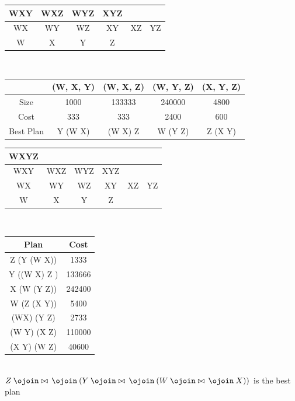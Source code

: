 \documentclass[12pt, letterpaper, fleqn]{article}
\def\fullouterjoin{\mathbin{\ojoin\mkern0mu\bowtie\mkern3mu\ojoin}}
\begin{document}
  \begin{center}
  \begin{tabular} {| c | c | c | c | c | c |}
  \hline
  WXY & WXZ & WYZ & XYZ & &\\
  \hline
  WX & WY & WZ & XY & XZ & YZ \\
  \hline
  W & X & Y & Z & & \\
  \hline
  \end{tabular}\\
  \begin{tabular} { c | c | c | c | c }
  & (W, X, Y) & (W, X, Z) & (W, Y, Z) & (X, Y, Z)  \\
  \hline
  Size & 1000 & 133333 & 240000 & 4800 \\
  Cost & 333  & 333 & 2400 & 600  \\
  Best Plan & Y \fullouterjoin (W \fullouterjoin X)  & (W \fullouterjoin X)
  \fullouterjoin Z & W \fullouterjoin (Y \fullouterjoin Z) & Z \fullouterjoin (X \fullouterjoin Y)
  \\
  \end{tabular}
  \end{center}

  \begin{center}
  \begin{tabular} {| c | c | c | c | c | c |}
  \hline
  WXYZ & & & & & \\
  \hline
  WXY & WXZ & WYZ & XYZ  & &  \\
  \hline
  WX & WY & WZ & XY & XZ & YZ \\
  \hline
  W & X & Y & Z & & \\
  \hline
  \end{tabular}\\
  \begin{tabular} { c | c  }
  Plan & Cost \\ 
  \hline
  Z \fullouterjoin (Y \fullouterjoin (W \fullouterjoin X)) &  1333 \\
  Y \fullouterjoin ((W \fullouterjoin X) \fullouterjoin Z )&  133666\\
  X \fullouterjoin (W \fullouterjoin (Y \fullouterjoin Z)) & 242400 \\
  W \fullouterjoin (Z \fullouterjoin (X \fullouterjoin Y)) &  5400 \\
  (W\fullouterjoin X) \fullouterjoin (Y \fullouterjoin Z)  & 2733 \\
  (W \fullouterjoin Y) \fullouterjoin (X \fullouterjoin Z) & 110000 \\
  (X \fullouterjoin Y) \fullouterjoin (W \fullouterjoin Z) & 40600 \\


  \end{tabular}
  \end{center}\\
  $Z \fullouterjoin (Y \fullouterjoin (W \fullouterjoin X))$ is the best plan
  \\\\
\end{document}
